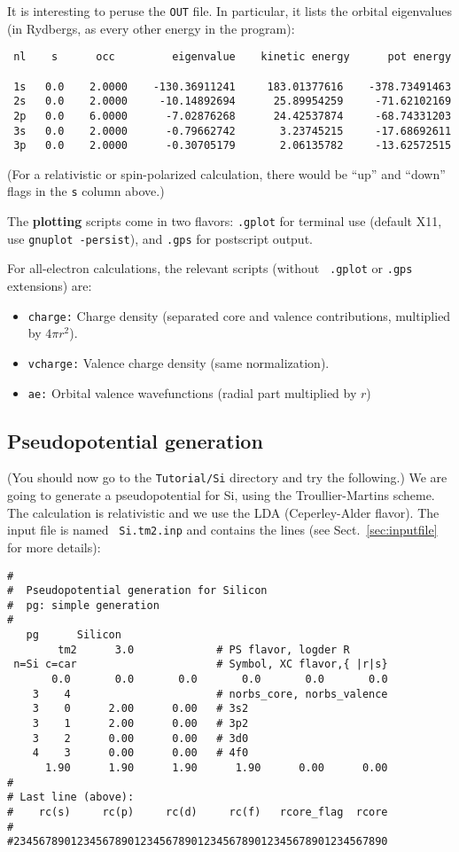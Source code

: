 \documentclass[11pt]{article}
\begin{document}
It is interesting to peruse the {\tt OUT} file.
In particular, it lists the orbital eigenvalues (in Rydbergs, as
every other energy in the program):

\begin{verbatim}
 nl    s      occ         eigenvalue    kinetic energy      pot energy

 1s   0.0    2.0000    -130.36911241     183.01377616    -378.73491463
 2s   0.0    2.0000     -10.14892694      25.89954259     -71.62102169
 2p   0.0    6.0000      -7.02876268      24.42537874     -68.74331203
 3s   0.0    2.0000      -0.79662742       3.23745215     -17.68692611
 3p   0.0    2.0000      -0.30705179       2.06135782     -13.62572515
\end{verbatim}

(For a relativistic or spin-polarized calculation, there would be
``up'' and ``down'' flags in the {\tt s} column above.)


The {\bf plotting} scripts come in two flavors: {\tt .gplot} for
terminal use (default X11, use {\tt gnuplot -persist}), and {\tt .gps}
for postscript output.  

For all-electron calculations, the relevant scripts (without {\tt
.gplot} or {\tt .gps} extensions) are:

\begin{itemize}
\item {\tt charge:} Charge density (separated core and valence
contributions, multiplied by $4\pi r^2$). 
\item {\tt vcharge:} Valence charge density (same normalization).
\item {\tt ae:} Orbital valence wavefunctions (radial part multiplied by $r$)
\end{itemize}

\subsection{Pseudopotential generation}

(You should now go to the {\tt Tutorial/Si} directory and try the
following.)  We are going to generate a pseudopotential for Si, using
the Troullier-Martins scheme. The calculation is relativistic and we
use the LDA (Ceperley-Alder flavor). The input file is named {\tt
Si.tm2.inp} and contains the lines (see Sect.~\ref{sec:inputfile} for more
details):

\begin{verbatim}
#
#  Pseudopotential generation for Silicon
#  pg: simple generation
#
   pg      Silicon
        tm2      3.0             # PS flavor, logder R
 n=Si c=car                      # Symbol, XC flavor,{ |r|s}
       0.0       0.0       0.0       0.0       0.0       0.0
    3    4                       # norbs_core, norbs_valence
    3    0      2.00      0.00   # 3s2
    3    1      2.00      0.00   # 3p2
    3    2      0.00      0.00   # 3d0
    4    3      0.00      0.00   # 4f0
      1.90      1.90      1.90      1.90      0.00      0.00
#
# Last line (above): 
#    rc(s)     rc(p)     rc(d)     rc(f)   rcore_flag  rcore
#
#23456789012345678901234567890123456789012345678901234567890
\end{verbatim}
\end{document}

